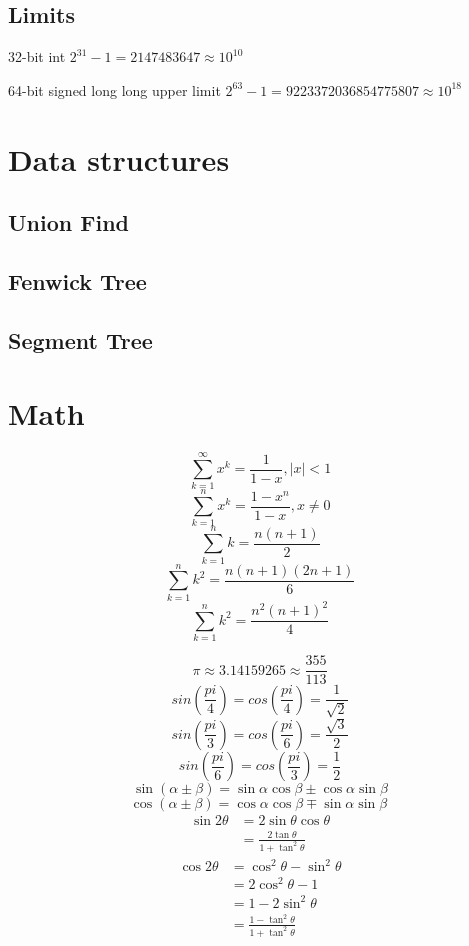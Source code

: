 \documentclass[a4paper,landscape,8pt]{article}
\begin{document}
\begin{multicols}{2}
\subsection{Limits}

32-bit int $2^{31} - 1 = 2147483647 \approx 10^{10}$

64-bit signed long long upper limit $2^{63} - 1 = 9223372036854775807 \approx 10^{18}$


\section{Data structures}

\subsection{Union Find}


\subsection{Fenwick Tree}


\subsection{Segment Tree}



\section{Math}



\[
  \sum_{k=1}^{\infty} x^k = \frac{1}{1-x}, \vert x \vert < 1
\]
\[
  \sum_{k=1}^{n} x^k = \frac{1-x^n}{1-x}, x \neq 0
\]
\[
  \sum_{k=1}^{n} k = \frac{n(n+1)}{2}
\]
\[
  \sum_{k=1}^{n} k^2 = \frac{n(n+1)(2n+1)}{6}
\]
\[
  \sum_{k=1}^{n} k^2 = \frac{n^2(n+1)^2}{4}
\]

\[
  \pi \approx 3.14159265 \approx \frac{355}{113}
\]
\[
  sin(\frac{pi}{4}) = cos(\frac{pi}{4}) = \frac{1}{\sqrt{2}}
\]
\[
  sin(\frac{pi}{3}) = cos(\frac{pi}{6}) = \frac{\sqrt{3}}{2}
\]
\[
  sin(\frac{pi}{6}) = cos(\frac{pi}{3}) = \frac{1}{2}
\]
\[
  \sin(\alpha \pm \beta) = \sin \alpha \cos \beta \pm \cos \alpha \sin \beta
\]
\[
  \cos(\alpha \pm \beta) = \cos \alpha \cos \beta \mp \sin \alpha \sin \beta\
\]
\begin{align*}
  \sin 2\theta &= 2 \sin \theta \cos \theta \\
               &= \frac{2 \tan \theta} {1 + \tan^2 \theta}
\end{align*}
\begin{align*}
  \cos 2\theta &= \cos^2 \theta - \sin^2 \theta \\
               &= 2 \cos^2 \theta - 1 \\
               &= 1 - 2 \sin^2 \theta \\
               &= \frac{1 - \tan^2 \theta} {1 + \tan^2 \theta}
\end{align*}
\newpage


\end{multicols}
\end{document}
